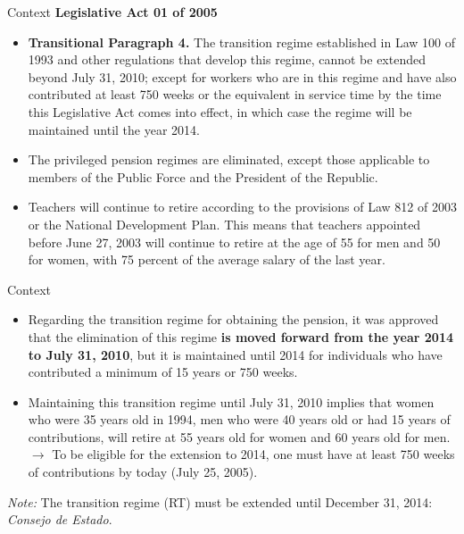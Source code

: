 \documentclass[11pt, aspectratio=169]{beamer}
\begin{document}
\begin{frame}{Context}
\textbf{Legislative Act 01 of 2005}

    \begin{itemize}
        \item \textbf{Transitional Paragraph 4.} The transition regime established in Law 100 of 1993 and other regulations that develop this regime, cannot be extended beyond July 31, 2010; except for workers who are in this regime and have also contributed at least 750 weeks or the equivalent in service time by the time this Legislative Act comes into effect, in which case the regime will be maintained until the year 2014.
        \item The privileged pension regimes are eliminated, except those applicable to members of the Public Force and the President of the Republic.
        \item Teachers will continue to retire according to the provisions of Law 812 of 2003 or the National Development Plan. This means that teachers appointed before June 27, 2003 will continue to retire at the age of 55 for men and 50 for women, with 75 percent of the average salary of the last year.
    \end{itemize}
\end{frame}

\begin{frame}{Context}

    \begin{itemize}
        \item Regarding the transition regime for obtaining the pension, it was approved that the elimination of this regime \textbf{is moved forward from the year 2014 to July 31, 2010}, but it is maintained until 2014 for individuals who have contributed a minimum of 15 years or 750 weeks.
        \item Maintaining this transition regime until July 31, 2010 implies that women who were 35 years old in 1994, men who were 40 years old or had 15 years of contributions, will retire at 55 years old for women and 60 years old for men. $\longrightarrow$ To be eligible for the extension to 2014, one must have at least 750 weeks of contributions by today (July 25, 2005).
    \end{itemize}

    \textit{Note:} The transition regime (RT) must be extended until December 31, 2014: \textit{Consejo de Estado}.

\end{frame}
\end{document}
